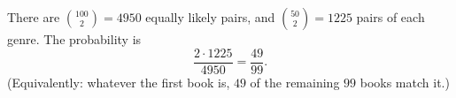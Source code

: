 There are $\binom{100}{2}=4950$ equally likely pairs, and $\binom{50}{2}=1225$ pairs of each genre. The probability is
\[
\dfrac{2\cdot1225}{4950}=\boxed{\dfrac{49}{99}} .
\]
(Equivalently: whatever the first book is, $49$ of the remaining $99$ books match it.)
